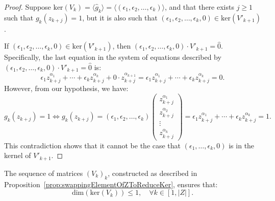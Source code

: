 \documentclass[11pt]{llncs}
\begin{document}
\begin{proof}
Suppose \( \text{ker}(V_k) = \langle \hat{g}_k \rangle = \langle (\epsilon_1, \epsilon_2, \dots, \epsilon_k) \rangle \), and that there exists \( j \geq 1 \) such that \( g_k(z_{k+j}) = 1 \), but it is also such that \( (\epsilon_1, \epsilon_2, \dots, \epsilon_k, 0) \in \text{ker}(V'_{k+1}) \).
  
If \( (\epsilon_1, \epsilon_2, \dots, \epsilon_k, 0) \in \text{ker}(V'_{k+1}) \), then \( (\epsilon_1, \epsilon_2, \dots, \epsilon_k, 0) \cdot V'_{k+1} = \hat{0} \). Specifically, the last equation in the system of equations described by \( (\epsilon_1, \epsilon_2, \dots, \epsilon_k, 0) \cdot V'_{k+1} = \hat{0} \) is:
   \[
\epsilon_1 z_{k+j}^{\alpha_1} + \cdots + \epsilon_k z_{k+j}^{\alpha_k} + 0 \cdot z_{k+j}^{\alpha_{k+1}} = \epsilon_1 z_{k+j}^{\alpha_1} + \cdots + \epsilon_k z_{k+j}^{\alpha_k} = 0.
\]
However, from our hypothesis, we have:
\[
g_k(z_{k+j}) = 1 \iff g_k(z_{k+j}) = 
(\epsilon_1, \epsilon_2, \dots, \epsilon_k)
\begin{pmatrix}
z_{k+j}^{\alpha_1} \\
z_{k+j}^{\alpha_2} \\
\vdots \\
z_{k+j}^{\alpha_k}
\end{pmatrix}
= \epsilon_1 z_{k+j}^{\alpha_1} + \cdots + \epsilon_k z_{k+j}^{\alpha_k} = 1.
\]
This contradiction shows that it cannot be the case that \( (\epsilon_1, \dots, \epsilon_k, 0) \) is in the kernel of \( V'_{k+1} \).   

\end{proof}

\begin{proposition}\label{prop:upperBoundOnRightKernel}
    The sequence of matrices \( (V_k)_k \), constructed as described in Proposition~\ref{prop:swappingElementOfZToReduceKer}, ensures that:    
    \[
    \text{dim}\left(\text{ker}\left(V_k\right)\right) \leq 1, \quad \forall k \in [1, |Z|].
    \]
\end{proposition}
\end{document}
